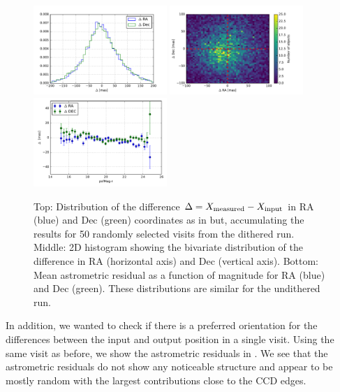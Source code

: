 \documentclass[twocolumn]{aastex62}
\begin{document}
\begin{figure}
  \centering
  \includegraphics[width=0.45\textwidth]{astrometry_imsim_dithered_50visits}
  \includegraphics[width=0.45\textwidth]{astrometry_imsim_dithered_50visits_hist2d}
  \includegraphics[width=0.45\textwidth]{astrometry_vs_mag_imsim_50_visits}
  \caption{Top: Distribution of the difference $\Delta=X_{\rm measured}-X_{\rm input}$ in RA (blue) and Dec (green) coordinates as in
   but, accumulating the results for 50 randomly selected visits from the dithered run. Middle: 2D histogram
  showing the bivariate distribution of the difference in RA (horizontal axis) and Dec (vertical axis). Bottom: Mean astrometric residual
  as a function of magnitude for RA (blue) and Dec (green). These distributions are similar for the undithered run.}
  \label{fig:astrometry_b}
\end{figure}

In addition, we wanted to check if there is a preferred orientation for the differences between the input and output position in a single visit. Using the same visit as before, we show the astrometric residuals in . We see that the astrometric residuals do not show any noticeable structure and appear to be mostly random with the largest contributions close to the CCD edges.
\end{document}
